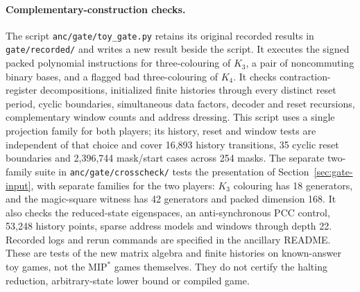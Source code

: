 \paragraph{Complementary-construction checks.} The script \texttt{anc/gate/toy\_gate.py} retains its original recorded results in \texttt{gate/recorded/} and writes a new result beside the script. It executes the signed packed polynomial instructions for three-colouring of $K_3$, a pair of noncommuting binary bases, and a flagged bad three-colouring of $K_4$. It checks contraction-register decompositions, initialized finite histories through every distinct reset period, cyclic boundaries, simultaneous data factors, decoder and reset recursions, complementary window counts and address dressing. This script uses a single projection family for both players; its history, reset and window tests are independent of that choice and cover 16,893 history transitions, 35 cyclic reset boundaries and 2,396,744 mask/start cases across 254 masks. The separate two-family suite in \texttt{anc/gate/crosscheck/} tests the presentation of Section~\ref{sec:gate-input}, with separate families for the two players: $K_3$ colouring has 18 generators, and the magic-square witness has 42 generators and packed dimension 168. It also checks the reduced-state eigenspaces, an anti-synchronous PCC control, 53,248 history points, sparse address models and windows through depth 22. Recorded logs and rerun commands are specified in the ancillary README. These are tests of the new matrix algebra and finite histories on known-answer toy games, not the $\mathrm{MIP}^*$ games themselves. They do not certify the halting reduction, arbitrary-state lower bound or compiled game.

